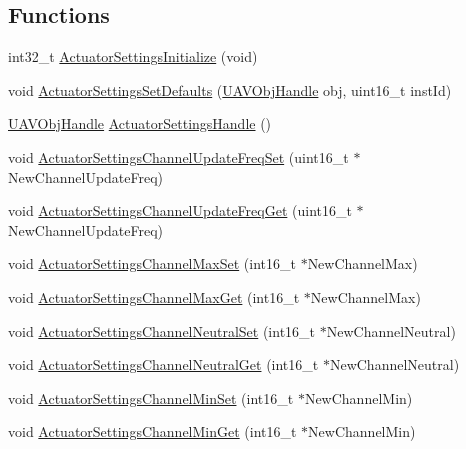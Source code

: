 \subsection*{\-Functions}
\begin{DoxyCompactItemize}
\item 
int32\-\_\-t \hyperlink{group___actuator_settings_ga96abed1fc71421f09d05c08946ddfc8c}{\-Actuator\-Settings\-Initialize} (void)
\item 
void \hyperlink{group___actuator_settings_ga9f943dc0a4aabc114f95eccc6fc4455b}{\-Actuator\-Settings\-Set\-Defaults} (\hyperlink{targets_2_u_a_v_objects_2inc_2uavobjectmanager_8h_a279053e22be53ce9f895043aaeb91e3b}{\-U\-A\-V\-Obj\-Handle} obj, uint16\-\_\-t inst\-Id)
\item 
\hyperlink{targets_2_u_a_v_objects_2inc_2uavobjectmanager_8h_a279053e22be53ce9f895043aaeb91e3b}{\-U\-A\-V\-Obj\-Handle} \hyperlink{group___actuator_settings_gaa449865ed415b24a9ce046ec21b5ea85}{\-Actuator\-Settings\-Handle} ()
\item 
void \hyperlink{group___actuator_settings_ga4c4fe1808bf0ced7c63837f46cf1e948}{\-Actuator\-Settings\-Channel\-Update\-Freq\-Set} (uint16\-\_\-t $\ast$\-New\-Channel\-Update\-Freq)
\item 
void \hyperlink{group___actuator_settings_gabb27fc0c299627a419c1b7f7f00e1f01}{\-Actuator\-Settings\-Channel\-Update\-Freq\-Get} (uint16\-\_\-t $\ast$\-New\-Channel\-Update\-Freq)
\item 
void \hyperlink{group___actuator_settings_ga8bad877441f6361bf8ccd01918d18900}{\-Actuator\-Settings\-Channel\-Max\-Set} (int16\-\_\-t $\ast$\-New\-Channel\-Max)
\item 
void \hyperlink{group___actuator_settings_ga832fc352852e8ff24fcba7c31b43b4f4}{\-Actuator\-Settings\-Channel\-Max\-Get} (int16\-\_\-t $\ast$\-New\-Channel\-Max)
\item 
void \hyperlink{group___actuator_settings_gaf63c8631b956fb23162a07af5744b286}{\-Actuator\-Settings\-Channel\-Neutral\-Set} (int16\-\_\-t $\ast$\-New\-Channel\-Neutral)
\item 
void \hyperlink{group___actuator_settings_ga884282af4843a577ce7ed00a2c355a9d}{\-Actuator\-Settings\-Channel\-Neutral\-Get} (int16\-\_\-t $\ast$\-New\-Channel\-Neutral)
\item 
void \hyperlink{group___actuator_settings_gab97fec2b38b3b8b973d153875bc692c9}{\-Actuator\-Settings\-Channel\-Min\-Set} (int16\-\_\-t $\ast$\-New\-Channel\-Min)
\item 
void \hyperlink{group___actuator_settings_gaaa63f7b0d328cf92bdf2a93ded2a745c}{\-Actuator\-Settings\-Channel\-Min\-Get} (int16\-\_\-t $\ast$\-New\-Channel\-Min)

\end{DoxyCompactItemize}
